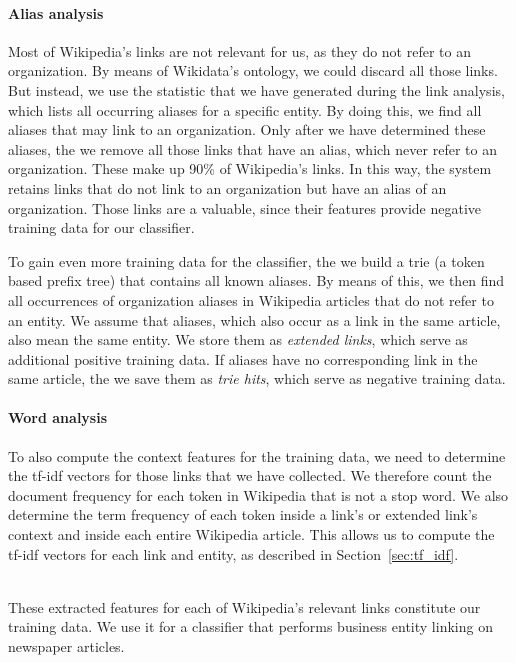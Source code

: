 \paragraph{Alias analysis}
\label{sec:alias_analysis}
Most of Wikipedia's links are not relevant for us, as they do not refer to an organization. By means of Wikidata's ontology, we could discard all those links. But instead, we use the statistic that we have generated during the link analysis, which lists all occurring aliases for a specific entity. By doing this, we find all aliases that may link to an organization. Only after we have determined these aliases, the we remove all those links that have an alias, which never refer to an organization. These make up 90\% of Wikipedia's links. In this way, the system retains links that do not link to an organization but have an alias of an organization. Those links are a valuable, since their features provide negative training data for our classifier.

To gain even more training data for the classifier, the we build a trie (a token based prefix tree) that contains all known aliases. By means of this, we then find all occurrences of organization aliases in Wikipedia articles that do not refer to an entity. We assume that aliases, which also occur as a link in the same article, also mean the same entity. We store them as \textit{extended links}, which serve as additional positive training data. If aliases have no corresponding link in the same article, the we save them as \textit{trie hits}, which serve as negative training data.


\paragraph{Word analysis}
To also compute the context features for the training data, we need to determine the tf-idf vectors for those links that we have collected. We therefore count the document frequency for each token in Wikipedia that is not a stop word. We also determine the term frequency of each token inside a link's or extended link's context and inside each entire Wikipedia article. This allows us to compute the tf-idf vectors for each link and entity, as described in Section~\ref{sec:tf_idf}.

~\\
These extracted features for each of Wikipedia's relevant links constitute our training data. We use it for a classifier that performs business entity linking on newspaper articles.

